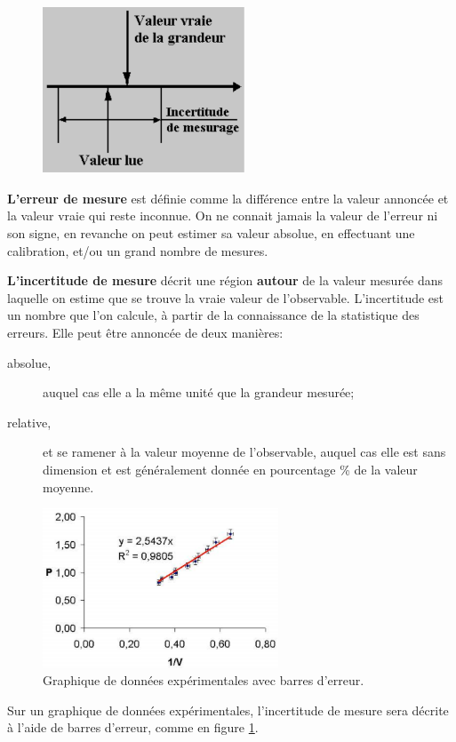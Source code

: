\begin{figure}
   \centering
   \vspace{-5.5mm}
   \includegraphics[width=6cm]{assets/figures/errinc.pdf}
\end{figure}

\textbf{L'erreur de mesure} est définie comme la différence entre la valeur annoncée et la valeur vraie qui reste inconnue. On ne connait jamais la valeur de l'erreur ni son signe, en revanche on peut estimer sa valeur absolue, en effectuant une calibration, et/ou un grand nombre de mesures.

\textbf{L'incertitude de mesure} décrit une région \textbf{autour} de la valeur mesurée dans laquelle on estime que se trouve la vraie valeur de l'observable. L'incertitude est un nombre que l'on calcule, à partir de la connaissance de la statistique des erreurs. Elle peut être annoncée de deux manières:
\begin{description}
\item[absolue,] auquel cas elle a la même unité que la grandeur mesurée;
\item[relative,] et se ramener à la valeur moyenne de l'observable, auquel cas elle est sans dimension et est généralement donnée en pourcentage \% de la valeur moyenne.
\end{description}

\begin{center}
\end{center}

\begin{figure}
   \centering
   \includegraphics[width=7cm]{assets/figures/errbar.pdf}
   \caption{Graphique de données expérimentales avec barres d'erreur.}
   \label{fig:errbar}
\end{figure}
Sur un graphique de données expérimentales, l'incertitude de mesure sera décrite à l'aide de barres d'erreur, comme en figure \ref{fig:errbar}.

